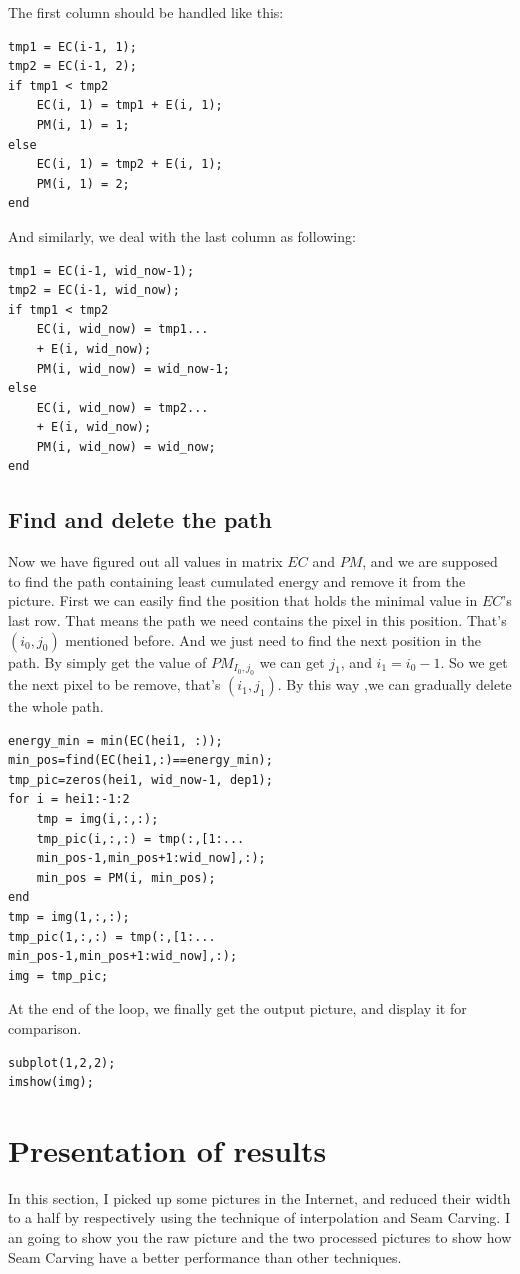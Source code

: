 \documentclass[final]{cvpr}
\begin{document}
The first column should be handled like this:
\begin{lstlisting}
tmp1 = EC(i-1, 1);
tmp2 = EC(i-1, 2);
if tmp1 < tmp2
    EC(i, 1) = tmp1 + E(i, 1);
    PM(i, 1) = 1;
else
    EC(i, 1) = tmp2 + E(i, 1);
    PM(i, 1) = 2;
end
\end{lstlisting}

And similarly, we deal with the last column as following:
\begin{lstlisting}
tmp1 = EC(i-1, wid_now-1);
tmp2 = EC(i-1, wid_now);
if tmp1 < tmp2
    EC(i, wid_now) = tmp1...
    + E(i, wid_now);
    PM(i, wid_now) = wid_now-1;
else
    EC(i, wid_now) = tmp2...
    + E(i, wid_now);
    PM(i, wid_now) = wid_now;
end
\end{lstlisting}

\subsection{Find and delete the path}
Now we have figured out all values in matrix $EC$ and $PM$, and we are supposed to find the path containing least cumulated energy and remove it from the picture. 
First we can easily find the position that holds the minimal value in $EC$'s last row. That means the path we need contains the pixel in this position. That's $(i_0,j_0)$ mentioned before. And we just need to find the next position in the path. By simply get the value of $PM_{I_0,j_0}$ we can get $j_1$, and $i_1 = i_0-1$. So we get the next pixel to be remove, that's $(i_1,j_1)$. By this way ,we can gradually delete the whole path.

\begin{lstlisting}
energy_min = min(EC(hei1, :));
min_pos=find(EC(hei1,:)==energy_min);
tmp_pic=zeros(hei1, wid_now-1, dep1);
for i = hei1:-1:2
    tmp = img(i,:,:);
    tmp_pic(i,:,:) = tmp(:,[1:...
    min_pos-1,min_pos+1:wid_now],:);
    min_pos = PM(i, min_pos);
end
tmp = img(1,:,:);
tmp_pic(1,:,:) = tmp(:,[1:...
min_pos-1,min_pos+1:wid_now],:);
img = tmp_pic;
\end{lstlisting}
At the end of the loop, we finally get the output picture, and display it for comparison.
\begin{lstlisting}
subplot(1,2,2);
imshow(img);
\end{lstlisting}

\section{Presentation of results}
In this section, I picked up some pictures in the Internet, and reduced their width to a half by respectively using the technique of interpolation and Seam Carving. I an going to show you the raw picture and the two processed pictures to show how Seam Carving have a better performance than other techniques.
\end{document}

